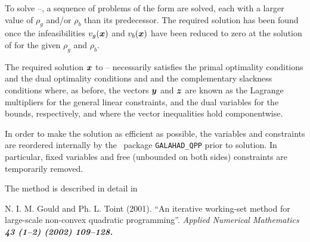 \documentclass{galahad}
\begin{document}
To solve --, a sequence of problems of the form  are
solved, each with a larger value of $\rho_g$ and/or $\rho_b$ 
than its predecessor. The
required solution has been found once the infeasibilities 
$v_g({\bm{x}})$ and $v_b({\bm{x}})$ have been reduced to zero at the solution of 
 for the given $\rho_g$ and $\rho_b$.

The required solution ${\bm{x}}$ to -- necessarily satisfies 
the primal optimality conditions
\disp{\bmA \bmx = \bmc}
and 
the dual optimality conditions
and 
and the complementary slackness conditions 
where, as before, the vectors ${\bm{y}}$ and ${\bm{z}}$ are 
known as the Lagrange multipliers for
the general linear constraints, and the dual variables for the bounds,
respectively, and where the vector inequalities hold componentwise.

In order to make the solution as efficient as possible, the 
variables and constraints are reordered internally
by the \galahad\ package {\tt GALAHAD\_QPP} prior to solution. 
In particular, fixed variables and 
free (unbounded on both sides) constraints are temporarily removed.

\vspace*{1mm}

\galreferences
\vspace*{1mm}

\noindent
The method is described in detail in
\vspace*{1mm}

\noindent
N. I. M. Gould and Ph. L. Toint (2001).
``An iterative working-set method 
for large-scale non-convex quadratic programming''.
\em Applied Numerical Mathematics
\bf 43 (1--2) \rm (2002) 109--128.

\end{document}
